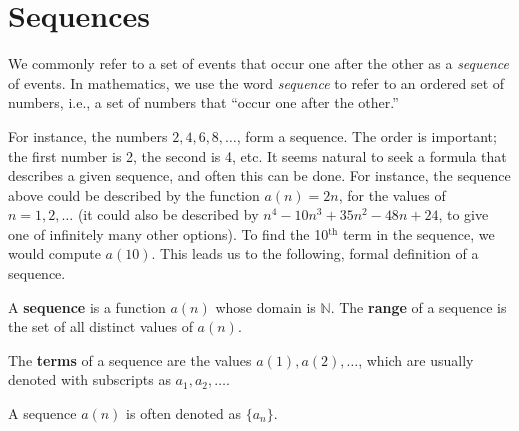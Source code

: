 
\section{Sequences}\label{sec:sequences}

We commonly refer to a set of events that occur one after the other as a \emph{sequence} of events. In mathematics, we use the word \emph{sequence} to refer to an ordered set of numbers, i.e., a set of numbers that ``occur one after the other.''

For instance, the numbers $2, 4, 6, 8, \dotsc$, form a sequence. The order is important; the first number is 2, the second is 4, etc. It seems natural to seek a formula that describes a given sequence, and often this can be done. For instance, the sequence above could be described by the function $a(n) = 2n$, for the values of $n = 1, 2, \dotsc$ (it could also be described by $n^4-10 n^3+35 n^2-48n+24$, to give one of infinitely many other options). To find the 10$^\text{th}$ term in the sequence, we would compute $a(10)$. This leads us to the following, formal definition of a sequence.

\begin{definition}[Sequence]\label{def:sequence}
%
%
A \textbf{sequence} is a function $a(n)$ whose domain is $\mathbb{N}$. The \textbf{range} of a sequence is the set of all distinct values of $a(n)$.
\bigskip

The \textbf{terms} of a sequence are the values $a(1), a(2), \dotsc$, which are usually denoted with subscripts as $a_1, a_2, \dotsc$.\bigskip

A sequence $a(n)$ is often denoted as $\{a_n\}$.
\end{definition}



